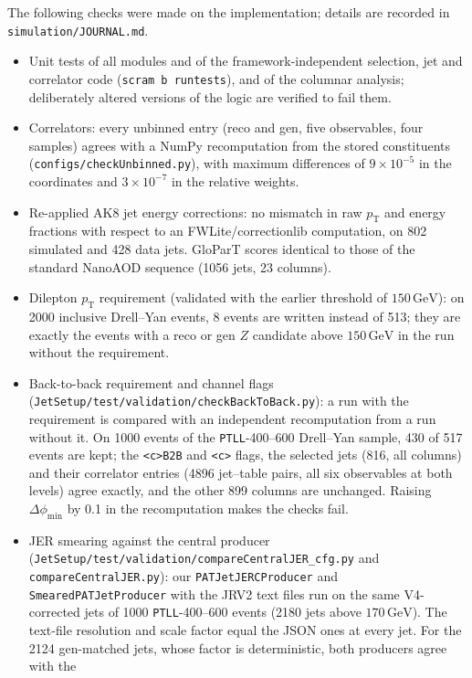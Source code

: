 \documentclass[11pt]{article}
\newcommand{\pt}{p_{\mathrm{T}}}
\newcommand{\GeV}{\ensuremath{\,\mathrm{GeV}}}
\newcommand{\code}[1]{\texttt{#1}}
\begin{document}
The following checks were made on the implementation; details are recorded in \code{simulation/JOURNAL.md}.
\begin{itemize}
\item Unit tests of all modules and of the framework-independent selection, jet and correlator code
  (\code{scram b runtests}), and of the columnar analysis; deliberately altered versions of the logic are verified to
  fail them.
\item Correlators: every unbinned entry (reco and gen, five observables, four samples) agrees with a NumPy
  recomputation from the stored constituents (\code{configs/checkUnbinned.py}), with maximum differences of
  $9\times10^{-5}$ in the coordinates and $3\times10^{-7}$ in the relative weights.
\item Re-applied AK8 jet energy corrections: no mismatch in raw $\pt$ and energy fractions with respect to an
  FWLite/correctionlib computation, on 802 simulated and 428 data jets. GloParT scores identical to those of the standard
  NanoAOD sequence (1056 jets, 23 columns).
\item Dilepton $\pt$ requirement (validated with the earlier threshold of $150\GeV$): on 2000 inclusive Drell--Yan
  events, 8 events are written instead of 513; they are exactly the events with a reco or gen $Z$ candidate above
  $150\GeV$ in the run without the requirement.
\item Back-to-back requirement and channel flags (\code{JetSetup/\allowbreak{}test/\allowbreak{}validation/\allowbreak{}checkBackToBack.py}): a run with
  the requirement is compared with an independent recomputation from a run without it. On 1000 events of the
  \code{PTLL}-400--600 Drell--Yan sample, 430 of 517 events are kept; the \code{<c>B2B} and \code{<c>} flags, the
  selected jets (816, all columns) and their correlator entries (4896 jet--table pairs, all six observables at both
  levels) agree exactly, and the other 899 columns are unchanged. Raising $\Delta\phi_\mathrm{min}$ by 0.1 in the
  recomputation makes the checks fail.
\item JER smearing against the central producer
  (\code{JetSetup/\allowbreak{}test/\allowbreak{}validation/\allowbreak{}compareCentralJER\_cfg.py} and \code{compareCentralJER.py}): our
  \code{PATJetJERCProducer} and \code{SmearedPATJetProducer} with the JRV2 text files run on the same V4-corrected jets
  of 1000 \code{PTLL}-400--600 events (2180 jets above $170\GeV$). The text-file resolution and scale factor equal the
  JSON ones at every jet. For the 2124 gen-matched jets, whose factor is deterministic, both producers agree with the

\end{itemize}
\end{document}
